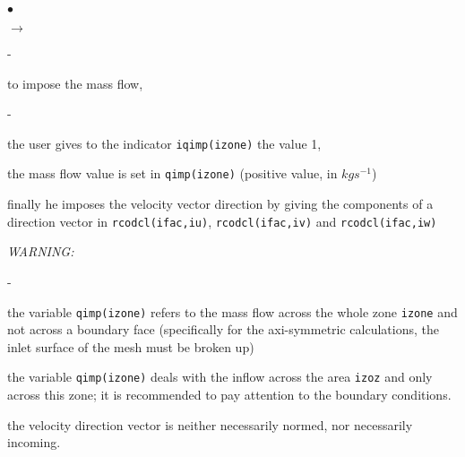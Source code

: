 {{{\begin{list}{$\bullet$}{}
\begin{list}{$\rightarrow$}{}
                          \begin{list}{-}{}
                                 \item to impose the mass flow,
                                     \begin{list}{-}{}
                                       \item the user gives to
                                             the indicator
                                             \texttt{iqimp(izone)}
                                             the value 1,
                                       \item  the
                                             mass flow value is set in
                                             \texttt{qimp(izone)}
                                             (positive value, in $kgs^{-1}$)
                                       \item finally he imposes the
                                             velocity vector direction
                                             by giving the components of
                                             a direction vector in
                                             \texttt{rcodcl(ifac,iu)}, \texttt{rcodcl(ifac,iv)} and \texttt{rcodcl(ifac,iw)}
                                     \end{list}

{\em WARNING:
\begin{list}{-}{}
\item the variable \texttt{qimp(izone)} refers to the mass flow across the whole
      zone \texttt{izone} and not across a boundary face (specifically for the axi-symmetric calculations, the inlet surface of the mesh must be broken up)
\item the variable \texttt{qimp(izone)} deals with the inflow across the area \texttt{izoz} and only across this zone; it is recommended to pay attention to the boundary conditions.
\item the velocity direction vector is neither necessarily normed, nor
      necessarily incoming.
\end{list}}


\end{list}
\end{list}
\end{list}}}}
